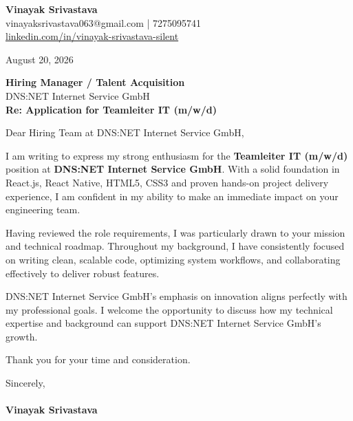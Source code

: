 \documentclass[11pt,a4paper]{article}
\begin{document}
\thispagestyle{empty}

{\Large \textbf{Vinayak Srivastava}}\\
vinayaksrivastava063@gmail.com | 7275095741 \\
\url{linkedin.com/in/vinayak-srivastava-silent}

\vspace{1em}
\hfill August 20, 2026

\textbf{Hiring Manager / Talent Acquisition}\\
DNS:NET Internet Service GmbH\\

\vspace{1.5em}
\textbf{Re: Application for Teamleiter IT (m/w/d)}

\vspace{1em}
Dear Hiring Team at DNS:NET Internet Service GmbH,

I am writing to express my strong enthusiasm for the \textbf{Teamleiter IT (m/w/d)} position at \textbf{DNS:NET Internet Service GmbH}. With a solid foundation in React.js, React Native, HTML5, CSS3 and proven hands-on project delivery experience, I am confident in my ability to make an immediate impact on your engineering team.

Having reviewed the role requirements, I was particularly drawn to your mission and technical roadmap. Throughout my background, I have consistently focused on writing clean, scalable code, optimizing system workflows, and collaborating effectively to deliver robust features.

DNS:NET Internet Service GmbH's emphasis on innovation aligns perfectly with my professional goals. I welcome the opportunity to discuss how my technical expertise and background can support DNS:NET Internet Service GmbH's growth.

Thank you for your time and consideration.

\vspace{1.5em}
Sincerely,\\
\vspace{1em}\\
\textbf{Vinayak Srivastava}
\end{document}

